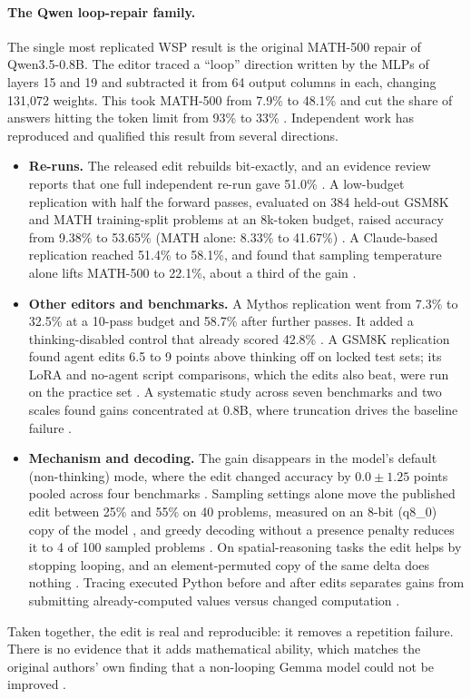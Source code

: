\paragraph{The Qwen loop-repair family.} The single most replicated WSP result is the original MATH-500 repair of Qwen3.5-0.8B. The editor traced a ``loop'' direction written by the MLPs of layers 15 and 19 and subtracted it from 64 output columns in each, changing 131{,}072 weights. This took MATH-500 from 7.9\% to 48.1\% and cut the share of answers hitting the token limit from 93\% to 33\% \citep{takehi2026sparks}. Independent work has reproduced and qualified this result from several directions.
\begin{itemize}[leftmargin=*,itemsep=2pt]
\item \textbf{Re-runs.} The released edit rebuilds bit-exactly, and an evidence review reports that one full independent re-run gave 51.0\% \citep{zen23954378}. A low-budget replication with half the forward passes, evaluated on 384 held-out GSM8K and MATH training-split problems at an 8k-token budget, raised accuracy from 9.38\% to 53.65\% (MATH alone: 8.33\% to 41.67\%) \citep{zen24416417}. A Claude-based replication reached 51.4\% to 58.1\%, and found that sampling temperature alone lifts MATH-500 to 22.1\%, about a third of the gain \citep{ax2611_20953}.
\item \textbf{Other editors and benchmarks.} A Mythos replication went from 7.3\% to 32.5\% at a 10-pass budget and 58.7\% after further passes. It added a thinking-disabled control that already scored 42.8\% \citep{zen24036186}. A GSM8K replication found agent edits 6.5 to 9 points above thinking off on locked test sets; its LoRA and no-agent script comparisons, which the edits also beat, were run on the practice set \citep{zen24208534}. A systematic study across seven benchmarks and two scales found gains concentrated at 0.8B, where truncation drives the baseline failure \citep{ax2611_09382}.
\item \textbf{Mechanism and decoding.} The gain disappears in the model's default (non-thinking) mode, where the edit changed accuracy by $0.0 \pm 1.25$ points pooled across four benchmarks \citep{zen24373917}. Sampling settings alone move the published edit between 25\% and 55\% on 40 problems, measured on an 8-bit (q8\_0) copy of the model \citep{zen24058693}, and greedy decoding without a presence penalty reduces it to 4 of 100 sampled problems \citep{zen24235217}. On spatial-reasoning tasks the edit helps by stopping looping, and an element-permuted copy of the same delta does nothing \citep{ax2611_27089}. Tracing executed Python before and after edits separates gains from submitting already-computed values versus changed computation \citep{ax2611_20566}.
\end{itemize}
Taken together, the edit is real and reproducible: it removes a repetition failure. There is no evidence that it adds mathematical ability, which matches the original authors' own finding that a non-looping Gemma model could not be improved \citep{takehi2026sparks}.

